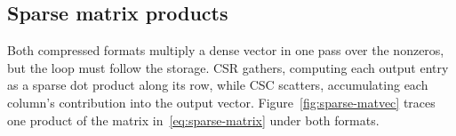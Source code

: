 \subsection{Sparse matrix products}\label{sec:bg-sparse-products}
Both compressed formats multiply a dense vector in one pass over the nonzeros, but the loop
must follow the storage.
CSR gathers, computing each output entry as a sparse dot product along its row, while CSC
scatters, accumulating each column's contribution into the output vector.
Figure~\ref{fig:sparse-matvec} traces one product of the matrix in~\eqref{eq:sparse-matrix}
under both formats.

